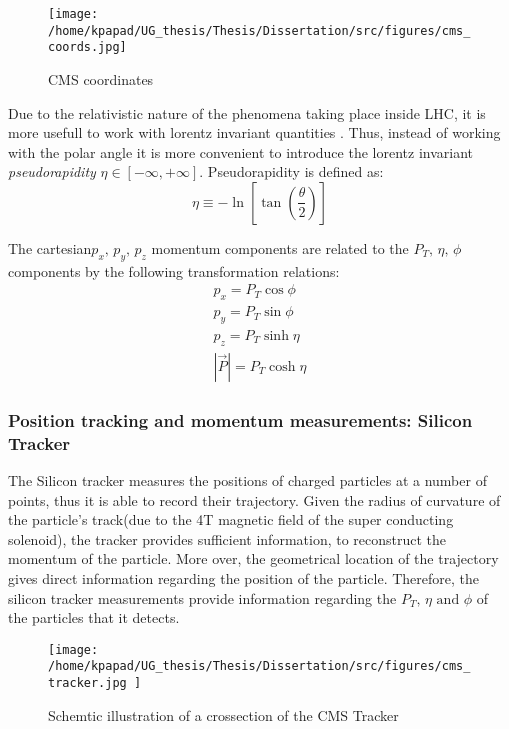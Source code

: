\begin{figure}[ht]
\centering
\texttt{[image: /home/kpapad/UG\_thesis/Thesis/Dissertation/src/figures/cms\_coords.jpg]}
\caption{CMS coordinates}
\label{fig:CMSCoords}
\end{figure}


Due to the relativistic nature of the phenomena taking place inside LHC, it is more usefull to work with lorentz invariant quantities \cite{AcceleratorsLecture}. Thus, instead of working with the polar angle it is more convenient to introduce the lorentz invariant  \emph{pseudorapidity} \(\eta\in \left [ -\infty, +\infty \right ]\).  Pseudorapidity is defined as:
\begin{equation}
\eta \equiv -\ln{\left [ \tan\left (\frac{\theta}{2} \right ) \right]  }
\end{equation}

The cartesian\(p_{x}\text{, } p_{y}\text{, }p_{z}\) momentum components are related to the \(P_{T}\text{, }\eta\text{, }\phi\)  components by the following transformation relations:
\begin{equation}
\begin{matrix}
p_{x} = P_{T}\cos{\phi} \\
p_{y} = P_{T}\sin{\phi} \\
p_{z} = P_{T}\sinh{\eta}\\
|\vec{P}| = P_{T}\cosh{\eta} 
\end{matrix}
\end{equation}

\subsubsection{Position tracking and momentum measurements: Silicon Tracker}
\label{sec:org2c477d8}
The Silicon tracker measures the positions of charged particles at a number of points, thus it is able to record their trajectory. Given the radius of curvature of the particle's track(due to the 4T magnetic field of the super conducting solenoid), the tracker provides sufficient information, to reconstruct the momentum of the particle. More over, the geometrical location of the trajectory gives direct information regarding the position of the particle. Therefore, the silicon tracker measurements  provide  information regarding the \(P_{T}\text{, } \eta\text{ and }\phi\) of the particles that it detects.

\begin{figure}[ht]
\centering
\texttt{[image: /home/kpapad/UG\_thesis/Thesis/Dissertation/src/figures/cms\_tracker.jpg ]}
\caption{Schemtic illustration of a crossection of the CMS Tracker }
\label{fig:si_tracker}
\end{figure}


